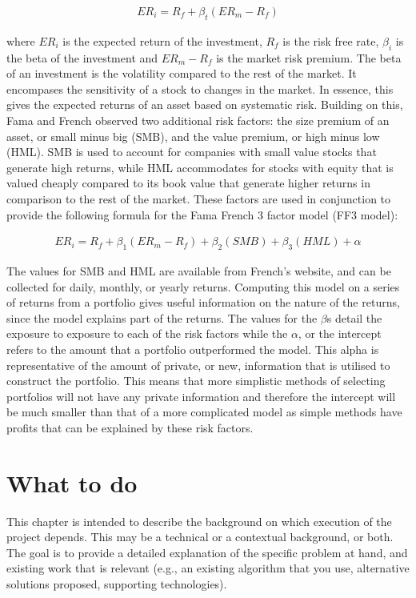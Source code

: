 \documentclass[ oneside,%
                    author={Joshua Felmeden},
                    degree={MEng},
                     title={Semantic Analysis of Financial Headlines Based on Realised Stock Returns},
                  subtitle={}]{dissertation}
\begin{document}
\begin{align*}
ER_i = R_f + \beta_t (ER_m - R_f)
\end{align*}

\noindent
where $ER_i$ is the expected return of the investment, $R_f$ is the risk free rate, $\beta_i$ is the beta of the investment and $ER_m - R_f$ is the market risk premium. The beta of an investment is the volatility compared to the rest of the market. It encompases the sensitivity of a stock to changes in the market. In essence, this gives the expected returns of an asset based on systematic risk. Building on this, Fama and French observed two additional risk factors: the size premium of an asset, or small minus big (SMB), and the value premium, or high minus low (HML). SMB is used to account for companies with small value stocks that generate high returns, while HML accommodates for stocks with equity that is valued cheaply compared to its book value that generate higher returns in comparison to the rest of the market. These factors are used in conjunction to provide the following formula for the Fama French 3 factor model (FF3 model):

\begin{align*}
ER_i = R_f + \beta_1(ER_m -R_f) + \beta_2 (SMB) + \beta_3(HML) + \alpha
\end{align*}

The values for SMB and HML are available from French's website, and can be collected for daily, monthly, or yearly returns. Computing this model on a series of returns from a portfolio gives useful information on the nature of the returns, since the model explains part of the returns. The values for the $\beta$s detail the exposure to exposure to each of the risk factors while the $\alpha$, or the intercept refers to the amount that a portfolio outperformed the model. This alpha is representative of the amount of private, or new, information that is utilised to construct the portfolio. This means that more simplistic methods of selecting portfolios will not have any private information and therefore the intercept will be much smaller than that of a more complicated model as simple methods have profits that can be explained by these risk factors.


\section{What to do}
\noindent
This chapter is intended to describe the background on which execution of the project depends. This may be a technical or a contextual background, or both. The goal is to provide a detailed explanation of the specific problem at hand, and existing work that is relevant (e.g., an existing algorithm that you use, alternative solutions proposed, supporting technologies).  
\end{document}
